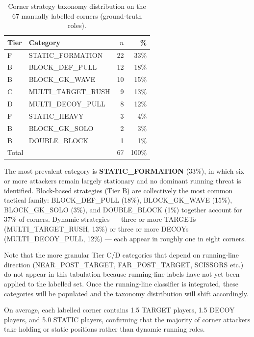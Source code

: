 \begin{table}[h]
  \centering
  \caption{Corner strategy taxonomy distribution on the 67 manually
           labelled corners (ground-truth roles).}
  \label{tab:sq2_taxonomy}
  \begin{tabular}{llrr}
    \toprule
    \textbf{Tier} & \textbf{Category} & \textbf{$n$} & \textbf{\%} \\
    \midrule
    F & STATIC\_FORMATION  & 22 & 33\% \\
    B & BLOCK\_DEF\_PULL   & 12 & 18\% \\
    B & BLOCK\_GK\_WAVE    & 10 & 15\% \\
    C & MULTI\_TARGET\_RUSH &  9 & 13\% \\
    D & MULTI\_DECOY\_PULL  &  8 & 12\% \\
    F & STATIC\_HEAVY       &  3 &  4\% \\
    B & BLOCK\_GK\_SOLO     &  2 &  3\% \\
    B & DOUBLE\_BLOCK       &  1 &  1\% \\
    \midrule
    \multicolumn{2}{l}{Total} & 67 & 100\% \\
    \bottomrule
  \end{tabular}
\end{table}

The most prevalent category is \textbf{STATIC\_FORMATION} (33\%), in which
six or more attackers remain largely stationary and no dominant running
threat is identified. Block-based strategies (Tier B) are collectively
the most common tactical family: BLOCK\_DEF\_PULL (18\%),
BLOCK\_GK\_WAVE (15\%), BLOCK\_GK\_SOLO (3\%), and DOUBLE\_BLOCK (1\%)
together account for 37\% of corners. Dynamic strategies — three or more
TARGETs (MULTI\_TARGET\_RUSH, 13\%) or three or more DECOYs
(MULTI\_DECOY\_PULL, 12\%) — each appear in roughly one in eight corners.

Note that the more granular Tier C/D categories that depend on running-line
direction (NEAR\_POST\_TARGET, FAR\_POST\_TARGET, SCISSORS etc.) do not
appear in this tabulation because running-line labels have not yet been
applied to the labelled set. Once the running-line classifier is
integrated, these categories will be populated and the taxonomy
distribution will shift accordingly.

On average, each labelled corner contains 1.5 TARGET players, 1.5 DECOY
players, and 5.0 STATIC players, confirming that the majority of corner
attackers take holding or static positions rather than dynamic running
roles.

